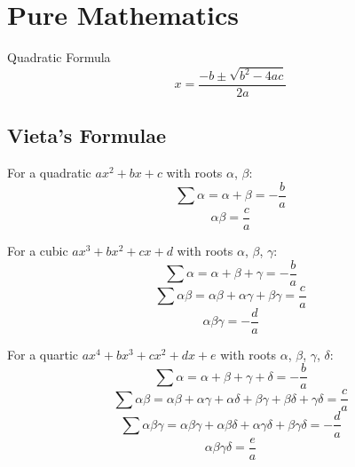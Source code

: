 \section{Pure Mathematics}
    Quadratic Formula
    \begin{equation} \label{eq:quadratic_formula}
        x=\frac{-b\pm\sqrt{b^2-4ac}}{2a}
    \end{equation}

    \subsection{Vieta's Formulae} \label{vietas_formulae}
        For a \gls{quadratic} $ax^2+bx+c$ with \glspl{root} $\alpha$, $\beta$:
        \begin{equation}
            \sum\alpha=\alpha+\beta=-\frac{b}{a}
        \end{equation}
        \begin{equation}
            \alpha\beta=\frac{c}{a}
        \end{equation}

        For a cubic $ax^3+bx^2+cx+d$ with \glspl{root} $\alpha$, $\beta$, $\gamma$:
        \begin{equation}
            \sum\alpha=\alpha+\beta+\gamma=-\frac{b}{a}
        \end{equation}
        \begin{equation}
            \sum\alpha\beta=\alpha\beta+\alpha\gamma+\beta\gamma=\frac{c}{a}
        \end{equation}
        \begin{equation}
            \alpha\beta\gamma=-\frac{d}{a}
        \end{equation}

        For a quartic $ax^4+bx^3+cx^2+dx+e$ with \glspl{root} $\alpha$, $\beta$, $\gamma$, $\delta$:
        \begin{equation}
            \sum\alpha=\alpha+\beta+\gamma+\delta=-\frac{b}{a}
        \end{equation}
        \begin{equation}
            \sum\alpha\beta=\alpha\beta+\alpha\gamma+\alpha\delta+\beta\gamma+\beta\delta+\gamma\delta=\frac{c}{a}
        \end{equation}
        \begin{equation}
            \sum\alpha\beta\gamma=\alpha\beta\gamma+\alpha\beta\delta+\alpha\gamma\delta+\beta\gamma\delta=-\frac{d}{a}
        \end{equation}
        \begin{equation}
            \alpha\beta\gamma\delta=\frac{e}{a}
        \end{equation}


